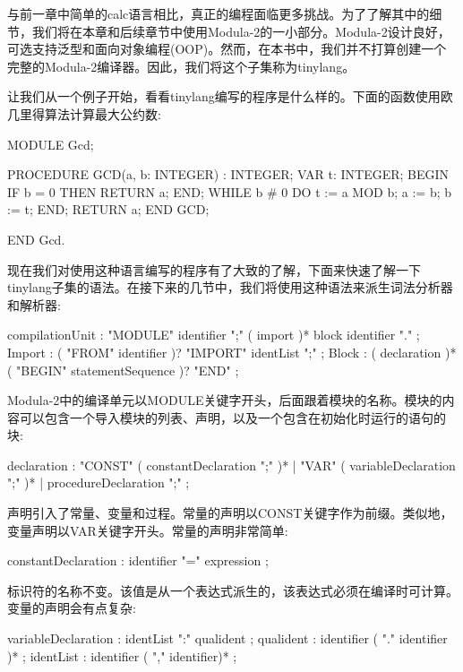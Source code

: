 与前一章中简单的calc语言相比，真正的编程面临更多挑战。为了了解其中的细节，我们将在本章和后续章节中使用Modula-2的一小部分。Modula-2设计良好，可选支持泛型和面向对象编程(OOP)。然而，在本书中，我们并不打算创建一个完整的Modula-2编译器。因此，我们将这个子集称为tinylang。

让我们从一个例子开始，看看tinylang编写的程序是什么样的。下面的函数使用欧几里得算法计算最大公约数:

\begin{shell}
MODULE Gcd;

PROCEDURE GCD(a, b: INTEGER) : INTEGER;
VAR t: INTEGER;
BEGIN
    IF b = 0 THEN
        RETURN a;
    END;
    WHILE b # 0 DO
        t := a MOD b;
        a := b;
        b := t;
    END;
    RETURN a;
END GCD;

END Gcd.
\end{shell}

现在我们对使用这种语言编写的程序有了大致的了解，下面来快速了解一下tinylang子集的语法。在接下来的几节中，我们将使用这种语法来派生词法分析器和解析器:

\begin{shell}
compilationUnit
    : "MODULE" identifier ";" ( import )* block identifier "." ;
Import : ( "FROM" identifier )? "IMPORT" identList ";" ;
Block
    : ( declaration )* ( "BEGIN" statementSequence )? "END" ;
\end{shell}

Modula-2中的编译单元以MODULE关键字开头，后面跟着模块的名称。模块的内容可以包含一个导入模块的列表、声明，以及一个包含在初始化时运行的语句的块:

\begin{shell}
declaration
    : "CONST" ( constantDeclaration ";" )*
    | "VAR" ( variableDeclaration ";" )*
    | procedureDeclaration ";" ;
\end{shell}

声明引入了常量、变量和过程。常量的声明以CONST关键字作为前缀。类似地，变量声明以VAR关键字开头。常量的声明非常简单:

\begin{shell}
constantDeclaration : identifier "=" expression ;
\end{shell}

标识符的名称不变。该值是从一个表达式派生的，该表达式必须在编译时可计算。变量的声明会有点复杂:

\begin{shell}
variableDeclaration : identList ":" qualident ;
qualident : identifier ( "." identifier )* ;
identList : identifier ( "," identifier)* ;
\end{shell}

